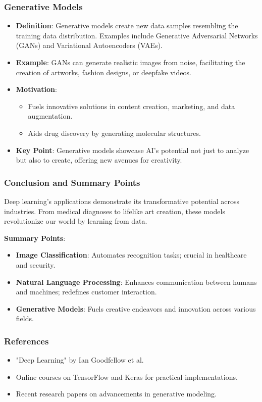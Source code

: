 \documentclass[aspectratio=169]{beamer}
\begin{document}
\begin{frame}[fragile]
    \frametitle{Generative Models}
    \begin{itemize}
        \item \textbf{Definition}: Generative models create new data samples resembling the training data distribution. Examples include Generative Adversarial Networks (GANs) and Variational Autoencoders (VAEs).
        \item \textbf{Example}: GANs can generate realistic images from noise, facilitating the creation of artworks, fashion designs, or deepfake videos.
        \item \textbf{Motivation}:
            \begin{itemize}
                \item Fuels innovative solutions in content creation, marketing, and data augmentation.
                \item Aids drug discovery by generating molecular structures.
            \end{itemize}
        \item \textbf{Key Point}: Generative models showcase AI's potential not just to analyze but also to create, offering new avenues for creativity.
    \end{itemize}
\end{frame}

\begin{frame}[fragile]
    \frametitle{Conclusion and Summary Points}
    Deep learning's applications demonstrate its transformative potential across industries. From medical diagnoses to lifelike art creation, these models revolutionize our world by learning from data.
    
    \textbf{Summary Points}:
    \begin{itemize}
        \item \textbf{Image Classification}: Automates recognition tasks; crucial in healthcare and security.
        \item \textbf{Natural Language Processing}: Enhances communication between humans and machines; redefines customer interaction.
        \item \textbf{Generative Models}: Fuels creative endeavors and innovation across various fields.
    \end{itemize}
\end{frame}

\begin{frame}[fragile]
    \frametitle{References}
    \begin{itemize}
        \item "Deep Learning" by Ian Goodfellow et al.
        \item Online courses on TensorFlow and Keras for practical implementations.
        \item Recent research papers on advancements in generative modeling.
    \end{itemize}
\end{frame}
\end{document}
